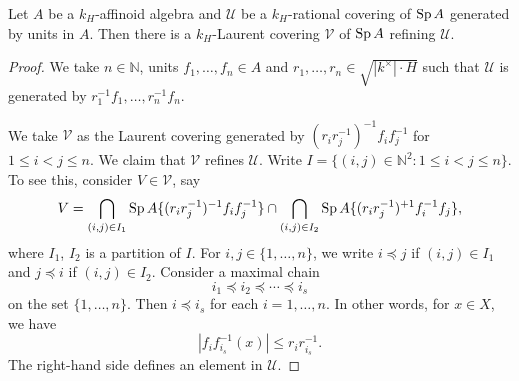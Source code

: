 \begin{lemma}\label{lma-prooftatelma3}
    Let $A$ be a $k_H$-affinoid algebra and $\mathcal{U}$ be a $k_H$-rational covering of $\operatorname{Sp} A$ generated by units in $A$. Then there is a $k_H$-Laurent covering $\mathcal{V}$ of $\operatorname{Sp} A$ refining $\mathcal{U}$.
\end{lemma}
\begin{proof}
    We take $n\in \mathbb{N}$, units $f_1,\ldots,f_n\in A$ and $r_1,\ldots,r_n\in \sqrt{|k^{\times}|\cdot H}$ such that $\mathcal{U}$ is generated by $r_1^{-1}f_1,\ldots,r_n^{-1}f_n$.

    We take $\mathcal{V}$ as the Laurent covering generated by $(r_i r_j^{-1})^{-1} f_if_j^{-1}$ for $1\leq i<j\leq n$. We claim that $\mathcal{V}$ refines $\mathcal{U}$. 
    Write $I=\{(i,j)\in \mathbb{N}^2:1\leq i<j\leq n\}$.
    To see this, consider $V\in \mathcal{V}$, say
    \[
        V=\bigcap_{(i,j)\in I_1} \operatorname{Sp} A\{ (r_i r_j^{-1})^{-1} f_if_j^{-1}\}\cap \bigcap_{(i,j)\in I_2} \operatorname{Sp} A\{ (r_i r_j^{-1})^{+1} f_i^{-1}f_j\},   
    \]
    where $I_1$, $I_2$ is a partition of $I$. For $i,j\in \{1,\ldots,n\}$, we write $i\preceq j$ if $(i,j)\in I_1$ and $j\preceq i$ if $(i,j)\in I_2$. Consider a maximal chain
    \[
        i_1\preceq i_2\preceq\cdots\preceq i_s
    \]
    on the set $\{1,\ldots,n\}$. Then $i\preceq i_s$ for each $i=1,\ldots,n$. 
    In other words, for $x\in X$, we have
    \[
        |f_if_{i_s}^{-1}(x)|\leq r_i r_{i_s}^{-1}.
    \]
    The right-hand side defines an element in $\mathcal{U}$.
\end{proof}



